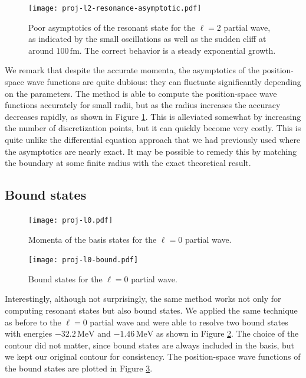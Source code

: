 \documentclass[amsmath, amssymb, aps, floatfix, nofootinbib, preprintnumbers,
  showpacs, superscriptaddress, twocolumn]{revtex4-1}
\begin{document}
\begin{figure}
  \texttt{[image: proj-l2-resonance-asymptotic.pdf]}
  \caption{Poor asymptotics of the resonant state for the $\ell = 2$ partial
    wave, as indicated by the small oscillations as well as the sudden cliff
    at around $100\,\mathrm{fm}$.  The correct behavior is a steady
    exponential growth.}
  \label{fig:l2-resonance-asymptotic}
\end{figure}

We remark that despite the accurate momenta, the asymptotics of the
position-space wave functions are quite dubious: they can fluctuate
significantly depending on the parameters.  The method is able to compute the
position-space wave functions accurately for small radii, but as the radius
increases the accuracy decreases rapidly, as shown in Figure
\ref{fig:l2-resonance-asymptotic}.  This is alleviated somewhat by increasing
the number of discretization points, but it can quickly become very costly.
This is quite unlike the differential equation approach that we had previously
used where the asymptotics are nearly exact.  It may be possible to remedy
this by matching the boundary at some finite radius with the exact theoretical
result.

\subsection{Bound states}

\begin{figure}
  \texttt{[image: proj-l0.pdf]}
  \caption{Momenta of the basis states for the $\ell = 0$ partial wave.}
  \label{fig:l0}
\end{figure}

\begin{figure}
  \texttt{[image: proj-l0-bound.pdf]}
  \caption{Bound states for the $\ell = 0$ partial wave.}
  \label{fig:l0-bound}
\end{figure}

Interestingly, although not surprisingly, the same method works not only for
computing resonant states but also bound states.  We applied the same
technique as before to the $\ell = 0$ partial wave and were able to resolve
two bound states with energies $-32.2\,\mathrm{MeV}$ and $-1.46\,\mathrm{MeV}$
as shown in Figure \ref{fig:l0}.  The choice of the contour did not matter,
since bound states are always included in the basis, but we kept our original
contour for consistency.  The position-space wave functions of the bound
states are plotted in Figure \ref{fig:l0-bound}.
\end{document}

